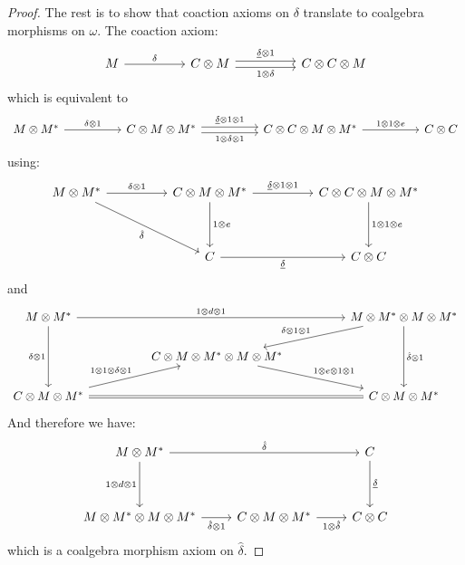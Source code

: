 \documentclass[8pt]{article}
\theoremstyle{definition}
\theoremstyle{definition}
\theoremstyle{definition}
\theoremstyle{definition}
\theoremstyle{definition}
\theoremstyle{definition}
\theoremstyle{definition}
\theoremstyle{definition}
\theoremstyle{definition}
\theoremstyle{definition}
\theoremstyle{definition}
\theoremstyle{definition}
\theoremstyle{definition}
\theoremstyle{definition}
\theoremstyle{question}
\begin{document}
\begin{proof}
  The rest is to show that coaction axioms on $\delta$ translate to coalgebra morphisms on $\omega$. The coaction axiom:
  \[
  \begin{tikzcd}
    M \ar[rr, "\delta"] && C \otimes M \ar[rr, shift left, "\underline{\delta} \otimes 1"] \ar[rr, shift right, "1 \otimes \delta"'] && C \otimes C \otimes M
  \end{tikzcd}
  \]
  which is equivalent to
  \[
  \begin{tikzcd}
    M \otimes M^* \ar[rr, "\delta \otimes 1"] && C \otimes M \otimes M^* \ar[rr, shift left, "\underline{\delta} \otimes 1 \otimes 1"] \ar[rr, shift right, "1 \otimes \delta \otimes 1"'] && C \otimes C \otimes M \otimes M^* \ar[rr, "1 \otimes 1 \otimes e"] && C \otimes C
  \end{tikzcd}
  \]
  using:
  \[
  \begin{tikzcd}
    M \otimes M^* \ar[rr, "\delta \otimes 1"] \ar[ddrr, "\hat{\delta}"'] && C \otimes M \otimes M^* \ar[dd, "1 \otimes e"] \ar[rr, "\underline{\delta} \otimes 1 \otimes 1"] && C \otimes C \otimes M \otimes M^* \ar[dd, "1 \otimes 1 \otimes e"]\\
    \\
    && C \ar[rr, "\underline{\delta}"'] && C \otimes C
  \end{tikzcd}
  \]
  and
  \[
  \begin{tikzcd}
    M \otimes M^* \ar[dd, "\delta \otimes 1"'] \ar[rrrr, "1 \otimes d \otimes 1"] &&&& M \otimes M^* \otimes M \otimes M^* \ar[dd, "\hat{\delta} \otimes 1"] \ar[dll, "\delta \otimes 1 \otimes 1"'] \\
    && C \otimes M \otimes M^* \otimes M \otimes M^* \ar[drr, "1 \otimes e \otimes 1 \otimes 1"] \\
    C \otimes M \otimes M^* \ar[rrrr, equal] \ar[urr, "1 \otimes 1 \otimes \delta \otimes 1"] &&&& C \otimes M \otimes M^*
  \end{tikzcd}
  \]
  And therefore we have:
  \[
  \begin{tikzcd}
    M \otimes M^* \ar[dd, "1 \otimes d \otimes 1"'] \ar[rr, "\hat{\delta}"] && C \ar[dd, "\underline{\delta}"]  \\
    \\
    M \otimes M^* \otimes M \otimes M^* \ar[r, "\hat{\delta} \otimes 1"'] & C \otimes M \otimes M^* \ar[r, "1 \otimes \hat{\delta}"'] & C \otimes C 
  \end{tikzcd}
\]
which is a coalgebra morphism axiom on $\hat{\delta}$.
\end{proof}
\end{document}
